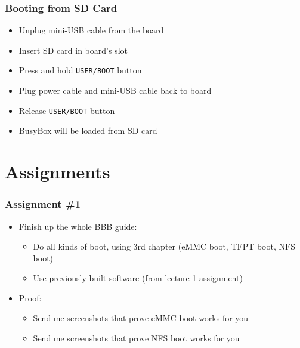 \documentclass[aspectratio=169]{beamer}
\begin{document}
\begin{frame}[fragile]
  \frametitle{Booting from SD Card}
  \begin{itemize}
    \item Unplug mini-USB cable from the board
    \item Insert SD card in board's slot
    \item Press and hold \texttt{USER/BOOT} button
    \item Plug power cable and mini-USB cable back to board
    \item Release \texttt{USER/BOOT} button
    \item BusyBox will be loaded from SD card
  \end{itemize}
\end{frame}

\section*{Assignments}

\begin{frame}
  \frametitle{Assignment \#1}
  \begin{itemize}
    \item Finish up the whole BBB guide:
      \begin{itemize}
        \item Do all kinds of boot, using 3rd chapter (eMMC boot, TFPT boot,
              NFS boot)
        \item Use previously built software (from lecture 1 assignment)
      \end{itemize}
    \item Proof:
      \begin{itemize}
        \item Send me screenshots that prove eMMC boot works for you
        \item Send me screenshots that prove NFS boot works for you
      \end{itemize}
  \end{itemize}
\end{frame}
\end{document}
